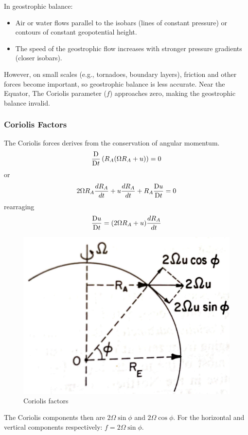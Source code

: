 In geostrophic balance:
\begin{itemize}
	\item Air or water flows parallel to the isobars (lines of constant pressure) or contours of constant geopotential height.
	\item The speed of the geostrophic flow increases with stronger pressure gradients (closer isobars).
\end{itemize}
However, on small scales (e.g., tornadoes, boundary layers), friction and other forces become important, so geostrophic balance is less accurate. Near the Equator, The Coriolis parameter ($f$) approaches zero, making the geostrophic balance invalid.


\subsubsection{Coriolis Factors}\label{subsubsec:coriolis-factors}
The Coriolis forces derives from the conservation of angular momentum.
\[\frac{\mathrm{D} }{\mathrm{D}t}\left(R_A(\Omega R_A+u)\right)=0\]
or
\[2\Omega R_A\frac{dR_A}{dt}+u\frac{dR_A}{dt}+R_A\frac{\mathrm{D} u}{\mathrm{D}t}=0\]
rearraging
\[\frac{\mathrm{D} u}{\mathrm{D}t}=(2\Omega R_A+u)\frac{dR_A}{dt}\]
\begin{figure}[h!]
	\centering
	\includegraphics[width=0.35\linewidth]{uploads/Screenshot 2024-11-21 164025.png}
	\caption{Coriolis factors}
	\label{fig:coriolis-factors}
\end{figure}
The Coriolis components then are $2\Omega\sin\phi$ and $2\Omega\cos\phi$. For the horizontal and vertical components respectively:
$f=2\Omega\sin\phi$.

